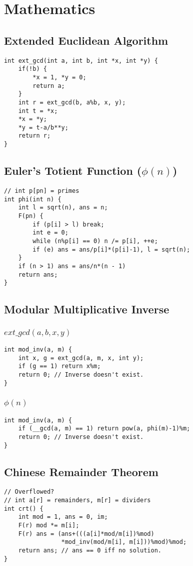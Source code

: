 \documentclass[10pt,twocolumn,oneside]{article}
\begin{document}
\tableofcontents
\scriptsize
\section{Mathematics}
\subsection{Extended Euclidean Algorithm}
\begin{verbatim}
int ext_gcd(int a, int b, int *x, int *y) {
    if(!b) {
        *x = 1, *y = 0;
        return a;
    }
    int r = ext_gcd(b, a%b, x, y);
    int t = *x;
    *x = *y;
    *y = t-a/b**y;
    return r;
}
\end{verbatim}
\subsection{Euler's Totient Function ($\phi(n)$)}
\begin{verbatim}
// int p[pn] = primes
int phi(int n) {
    int l = sqrt(n), ans = n;
    F(pn) {
        if (p[i] > l) break;
        int e = 0;
        while (n%p[i] == 0) n /= p[i], ++e;
        if (e) ans = ans/p[i]*(p[i]-1), l = sqrt(n);
    }
    if (n > 1) ans = ans/n*(n - 1)
    return ans;
}
\end{verbatim}
\subsection{Modular Multiplicative Inverse}
\subsubsection{$ext\_gcd(a, b, x, y)$}
\begin{verbatim}
int mod_inv(a, m) {
    int x, g = ext_gcd(a, m, x, int y);
    if (g == 1) return x%m;
    return 0; // Inverse doesn't exist.
}
\end{verbatim}
\subsubsection{$\phi(n)$}
\begin{verbatim}
int mod_inv(a, m) {
    if (__gcd(a, m) == 1) return pow(a, phi(m)-1)%m;
    return 0; // Inverse doesn't exist.
}
\end{verbatim}
\subsection{Chinese Remainder Theorem}
\begin{verbatim}
// Overflowed?
// int a[r] = remainders, m[r] = dividers
int crt() {
    int mod = 1, ans = 0, im;
    F(r) mod *= m[i];
    F(r) ans = (ans+(((a[i]*mod/m[i])%mod)
                *mod_inv(mod/m[i], m[i]))%mod)%mod;
    return ans; // ans == 0 iff no solution.
}
\end{verbatim}
\end{document}
